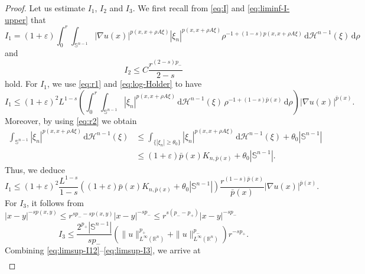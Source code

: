 \documentclass[11pt]{amsart}
\theoremstyle{plain}
\theoremstyle{definition}
\numberwithin{equation}{section}
\begin{document}
\begin{proof}
Let us estimate $I_{1}$, $I_{2}$ and $I_{3}$. We first recall from \eqref{eq:I} and \eqref{eq:liminf-I-upper} that
\begin{equation*}
I_{1} = (1+\varepsilon) \int_{0}^{r} \int_{\mathbb{S}^{n-1}} |\nabla u(x)|^{p(x, x+\rho A\xi)} |\xi_{n}|^{p(x, x+\rho A \xi)} \rho^{-1+(1-s)p(x, x+\rho A\xi)} \,\mathrm{d}\mathcal{H}^{n-1}(\xi) \,\mathrm{d}\rho
\end{equation*}
and
\begin{equation} \label{eq:limsup-I2}
I_{2} \leq C \frac{r^{(2-s)p_-}}{2-s}
\end{equation}
hold. For $I_{1}$, we use \eqref{eq:r1} and \eqref{eq:log-Holder} to have
\begin{equation*}
I_{1} \leq (1+\varepsilon)^{2} L^{1-s} \left( \int_{0}^{r} \int_{\mathbb{S}^{n-1}} |\xi_{n}|^{p(x, x+\rho A\xi)} \,\mathrm{d}\mathcal{H}^{n-1}(\xi) \,\rho^{-1+(1-s)\bar{p}(x)} \,\mathrm{d}\rho \right) |\nabla u(x)|^{\bar{p}(x)}.
\end{equation*}
Moreover, by using \eqref{eq:r2} we obtain
\begin{equation*}
\begin{split}
\int_{\mathbb{S}^{n-1}} |\xi_{n}|^{p(x, x+\rho A\xi)} \,\mathrm{d}\mathcal{H}^{n-1}(\xi)
&\leq \int_{\lbrace |\xi_{n}| \geq \theta_{0} \rbrace} |\xi_n|^{p(x, x+\rho A\xi)} \,\mathrm{d}\mathcal{H}^{n-1}(\xi) + \theta_{0} |\mathbb{S}^{n-1}| \\
&\leq (1+\varepsilon) \bar{p}(x) K_{n, \bar{p}(x)} + \theta_{0} |\mathbb{S}^{n-1}|.
\end{split}
\end{equation*}
Thus, we deduce
\begin{equation} \label{eq:limsup-I1}
I_{1} \leq (1+\varepsilon)^{2} \frac{L^{1-s}}{1-s} \left( (1+\varepsilon) \bar{p}(x) K_{n, \bar{p}(x)} + \theta_{0} |\mathbb{S}^{n-1}| \right) \frac{r^{(1-s)\bar{p}(x)}}{\bar{p}(x)} |\nabla u(x)|^{\bar{p}(x)}.
\end{equation}
For $I_{3}$, it follows from $|x-y|^{-sp(x, y)} \leq r^{sp_{-} - sp(x, y)} |x-y|^{-sp_{-}} \leq r^{s(p_{-} - p_{+})} |x-y|^{-sp_{-}}$
\begin{equation} \label{eq:limsup-I3}
I_{3} \leq \frac{2^{p_{+}} |\mathbb{S}^{n-1}|}{sp_{-}} \left( \|u\|_{L^{\infty}(\mathbb{R}^{n})}^{p_{+}} + \|u\|_{L^{\infty}(\mathbb{R}^{n})}^{p_{-}} \right) r^{-sp_{+}}.
\end{equation}
Combining \eqref{eq:limsup-I12}--\eqref{eq:limsup-I3}, we arrive at
\begin{equation*}
\begin{split}

\end{split}
\end{equation*}
\end{proof}
\end{document}
